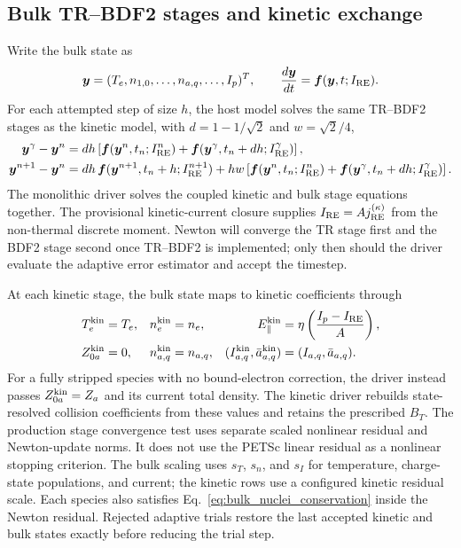 \documentclass[11pt]{article}
\begin{document}
\subsection{Bulk TR--BDF2 stages and kinetic exchange}

Write the bulk state as
\begin{equation}
 \bm y=(T_e,n_{1,0},\ldots,n_{a,q},\ldots,I_p)^T,
 \qquad \frac{d\bm y}{dt}=\bm f(\bm y,t;I_{\rm RE}).
 \label{eq:bulk_state_rhs}
\end{equation}
For each attempted step of size $h$, the host model solves the same TR--BDF2 stages as
the kinetic model, with $d=1-1/\sqrt2$ and $w=\sqrt2/4$,
\begin{align}
 \bm y^\gamma-\bm y^n
 &=dh\left[\bm f(\bm y^n,t_n;I_{\rm RE}^n)
 +\bm f(\bm y^\gamma,t_n+dh;I_{\rm RE}^\gamma)\right],\\
 \bm y^{n+1}-\bm y^n
 &=dh\,\bm f(\bm y^{n+1},t_n+h;I_{\rm RE}^{n+1})
 +hw\left[\bm f(\bm y^n,t_n;I_{\rm RE}^n)
 +\bm f(\bm y^\gamma,t_n+dh;I_{\rm RE}^\gamma)\right].
 \label{eq:bulk_trbdf2}
\end{align}
The monolithic driver solves the coupled kinetic and bulk stage equations together.
The provisional kinetic-current closure supplies $I_{\rm RE}=A j_{\rm RE}^{(\kappa)}$
from the non-thermal discrete moment.  Newton will converge the TR stage first and the
BDF2 stage second once TR--BDF2 is implemented; only then should the driver evaluate
the adaptive error estimator and accept the timestep.

At each kinetic stage, the bulk state maps to kinetic coefficients through
\begin{align}
 T_e^{\rm kin}&=T_e, & n_e^{\rm kin}&=n_e,
 &E_\parallel^{\rm kin}&=\eta\left(\frac{I_p-I_{\rm RE}}{A}\right),\\
 Z_{0a}^{\rm kin}&=0, & n_{a,q}^{\rm kin}&=n_{a,q},
 & (I_{a,q}^{\rm kin},\bar a_{a,q}^{\rm kin})&=(I_{a,q},\bar a_{a,q}).
 \label{eq:bulk_to_kinetic_mapping}
\end{align}
For a fully stripped species with no bound-electron correction, the driver instead passes
$Z_{0a}^{\rm kin}=Z_a$ and its current total density.  The kinetic driver rebuilds
state-resolved collision coefficients from these values and retains the prescribed $B_T$.
The production stage convergence test uses separate scaled nonlinear residual and
Newton-update norms.  It does not use the PETSc linear residual as a nonlinear
stopping criterion.  The bulk scaling uses $s_T$, $s_n$, and $s_I$ for temperature,
charge-state populations, and current; the kinetic rows use a configured kinetic
residual scale.  Each species also satisfies Eq.~\eqref{eq:bulk_nuclei_conservation}
inside the Newton residual.  Rejected adaptive trials restore the last accepted
kinetic and bulk states exactly before reducing the trial step.
\end{document}
